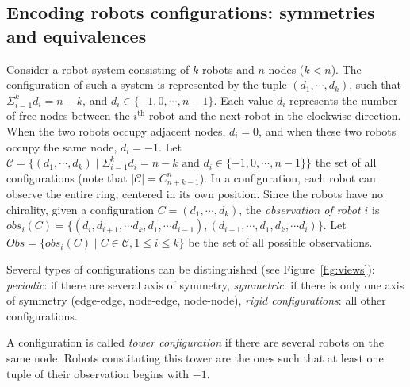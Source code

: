 \documentclass[envcountsame]{llncs} \usepackage[english]{babel}
\newcommand{\obs}{\ensuremath{\mathit{obs}}}
\newcommand{\Config}{\ensuremath{\mathcal{C}}}
\begin{document}
\subsection{Encoding robots configurations: symmetries and equivalences}
Consider a robot system consisting of $k$ robots and $n$ nodes ($k<n$).
 The configuration of such a system is represented by the tuple $(d_1,\cdots, d_k)$, such that $\Sigma_{i=1}^k d_i=n-k$, 
and $d_i\in \{-1,0,\cdots, n-1\}$. 
Each value $d_i$ represents the number of free nodes between the $i^{\textrm{th}}$ robot and
the next robot in the clockwise direction. When the two robots occupy adjacent nodes, $d_i=0$, and when 
these two robots occupy the same node, $d_i=-1$. Let $\Config = \{(d_1, \cdots, d_k)\mid
\Sigma_{i=1}^k d_i=n-k\textrm{ and }d_i\in \{-1,0,\cdots,n-1\}\}$ the set of all configurations (note that $|\Config| = C^{n}_{n+k-1}$). 
In a configuration, each robot can observe the entire ring, centered in
its own position. Since the robots have no chirality,  given a configuration $C=(d_1,\cdots, d_k)$, the 
\emph{observation of robot $i$} is  $\obs_i(C)=\{(d_i, d_{i+1}, \cdots d_k, d_1, 
\cdots d_{i-1}), (d_{i-1},\cdots, d_1, d_k, \cdots d_i)\}$. Let $Obs = \{\obs_i(C)\mid C\in\Config, 1\leq i\leq k\}$ be 
the set of all possible observations.


Several types of configurations can be distinguished (see Figure~\ref{fig:views}): 
\textit{periodic}: if there are several axis of symmetry,
\textit{symmetric}: if there is only one axis of symmetry (edge-edge, node-edge, node-node),
\textit{rigid configurations}: all other configurations.

A configuration is called \emph{tower configuration} if there are several robots on the same node.  Robots constituting this tower are the ones such that at least one tuple of their 
observation begins with $-1$.
\end{document}

